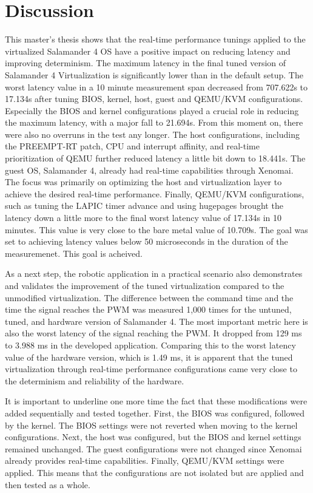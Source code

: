 \documentclass[MMR,Master,english]{twbook}
\begin{document}
\clearpage

\chapter{Discussion}\label{cha:discussion}
This master's thesis shows that the real-time performance tunings applied to the virtualized Salamander 4 OS have a positive impact on reducing latency and improving determinism. The maximum latency in the final tuned version of Salamander 4 Virtualization is significantly lower than in the default setup. The worst latency value in a 10 minute measurement span decreased from 707.622\textmu s to 17.134\textmu s after tuning  BIOS, kernel, host, guest and QEMU/KVM configurations. Especially the BIOS and kernel configurations played a crucial role in reducing the maximum latency, with a major fall to 21.694\textmu s. From this moment on, there were also no overruns in the test any longer. The host configurations, including the PREEMPT-RT patch, CPU and interrupt affinity, and real-time prioritization of QEMU further reduced latency a little bit down to 18.441\textmu s. The guest OS, Salamander 4, already had real-time capabilities through Xenomai. The focus was primarily on optimizing the host and virtualization layer to achieve the desired real-time performance. Finally, QEMU/KVM configurations, such as tuning the LAPIC timer advance and using hugepages brought the latency down a little more to the final worst latency value of 17.134\textmu s in 10 minutes. This value is very close to the bare metal value of 10.709\textmu s. The goal was set to achieving latency values below 50 microseconds in the duration of the measuremenet. This goal is acheived.

\bigskip \noindent As a next step, the robotic application in a practical scenario also demonstrates and validates the improvement of the tuned virtualization compared to the unmodified virtualization. The difference between the command time and the time the signal reaches the PWM was measured 1,000 times for the untuned, tuned, and hardware version of Salamander 4. The most important metric here is also the worst latency of the signal reaching the PWM. It dropped from 129 ms to 3.988 ms in the developed application. Comparing this to the worst latency value of the hardware version, which is 1.49 ms, it is apparent that the tuned virtualization through real-time performance configurations came very close to the determinism and reliability of the hardware.

\bigskip \noindent It is important to underline one more time the fact that these modifications were added sequentially and tested together. First, the BIOS was configured, followed by the kernel. The BIOS settings were not reverted when moving to the kernel configurations. Next, the host was configured, but the BIOS and kernel settings remained unchanged. The guest configurations were not changed since Xenomai already provides real-time capabilities. Finally, QEMU/KVM settings were applied. This means that the configurations are not isolated but are applied and then tested as a whole.
\end{document}
